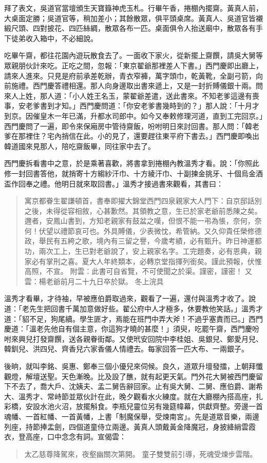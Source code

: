 拜了表文，吳道官當壇頒生天寶籙神虎玉札。行畢午香，捲棚內擺齋。黃真人前，大桌面定勝；吳道官等，稍加差小；其餘散眾，俱平頭桌席。黃真人、吳道官皆襯緞尺頭、四對披花、四匹絲綢，散眾各布一匹。桌面俱令人抬送廟中，散眾各有手下徒弟收入箱中，不必細說。

吃畢午齋，都往花園內遊玩散食去了。一面收下家火，從新擺上齋饌，請吳大舅等眾親朋伙計來吃。正吃之間，忽報：「東京翟爺那裡差人下書。」西門慶即出廳上，請來人進來。只見是府前承差乾辦，青衣窄褲，萬字頭巾，乾黃靴，全副弓箭，向前施禮。西門慶答禮相還。那人向身邊取出書來遞上，又是一封折賻儀銀十兩。問來人上姓，那人道：「小人姓王名玉，蒙翟爺差遣，送此書來。不知老爹這邊有喪事，安老爹書到才知。」西門慶問道：「你安老爹書幾時到的？」那人說：「十月才到京。因催皇木一年已滿，升都水司郎中。如今又奉敕修理河道，直到工完回京。」西門慶問了一遍，即令來保廂房中管待齋飯，吩咐明日來討回書。那人問：「韓老爹在那裡住？宅內捎信在此。小的見了，還要趕往東平府下書去。」西門慶即喚出韓道國來見那人，陪吃齋飯畢，同往家中去了。

西門慶拆看書中之意，於是乘著喜歡，將書拿到捲棚內教溫秀才看。說：「你照此修一封回書答他，就捎寄十方縐紗汗巾、十方綾汗巾、十副揀金挑牙、十個烏金酒盃作回奉之禮。他明日就來取回書。」溫秀才接過書來觀看，其書曰：
\begin{quote}
寓京都眷生翟謙頓首，書奉即擢大錦堂西門四泉親家大人門下：自京邸話別之後，未得從容相敘，心甚歉然。其領教之意，生已於家老爺前悉陳之矣。邇者，安鳳山書到，方知老親家有鼓盆之嘆，但恨不能一弔為悵，奈何，奈何！伏望以禮節哀可也。外具賻儀，少表微忱，希管納。又久仰貴任榮修德政，舉民有五絝之歌，境內有三留之譽，今歲考績，必有甄升。昨日神運都功，兩次工上，生已對老爺說了，安上親家名字。工完題奏，必有恩典，親家必有掌刑之喜。夏大人年終類本，必轉京堂指揮列銜矣。謹此預報，伏惟高照，不宣。
附雲：此書可自省覽，不可使聞之於渠。謹密，謹密！
又雲：楊老爺前月二十九日卒於獄。
冬上浣具
\end{quote}

溫秀才看畢，才待袖，早被應伯爵取過來，觀看了一遍，還付與溫秀才收了。說道：「老先生把回書千萬加意做好些。翟公府中人才極多，休要教他笑話。」溫秀才道：「貂不足，狗尾續。學生匪才，焉能在班門中弄大斧！不過乎塞責而已。」西門慶道：「溫老先他自有個主意，你這狗才曉的甚麼！」須臾，吃罷午齋，西門慶吩咐來興兒打發齋饌，送各親眷街鄰。又使玳安回院中李桂姐、吳銀兒、鄭愛月兒、韓釧兒、洪四兒、齊香兒六家香儀人情禮去。每家回答一匹大布、一兩銀子。

後晌，就叫李銘、吳惠、鄭奉三個小優兒來伺候。良久，道眾升壇發擂，上朝拜懺觀燈，解壇送聖。天色漸晚。比及設了醮，就有起更天氣。門外花大舅被西門慶留下不去了，喬大戶、沈姨夫、孟二舅告辭回家。止有吳大舅、二舅、應伯爵、謝希大、溫秀才、常峙節並眾伙計在此，晚夕觀看水火練度。就在大廳棚內搭高座，扎彩橋，安設水池火沼，放擺斛食。李瓶兒靈位另有幾筵幃幕，供獻齊整。旁邊一首魂幡、一首紅幡、一首黃幡，上書「制魔保舉，受煉南宮」。先是道眾音樂，兩邊列座，持節捧盂劍，四個道童侍立兩邊。黃真人頭戴黃金降魔冠，身披絳綃雲霞衣，登高座，口中念念有詞。宣偈雲：
\begin{quote}
太乙慈尊降駕來，夜壑幽關次第開。
童子雙雙前引導，死魂受煉步雲階。
\end{quote}

